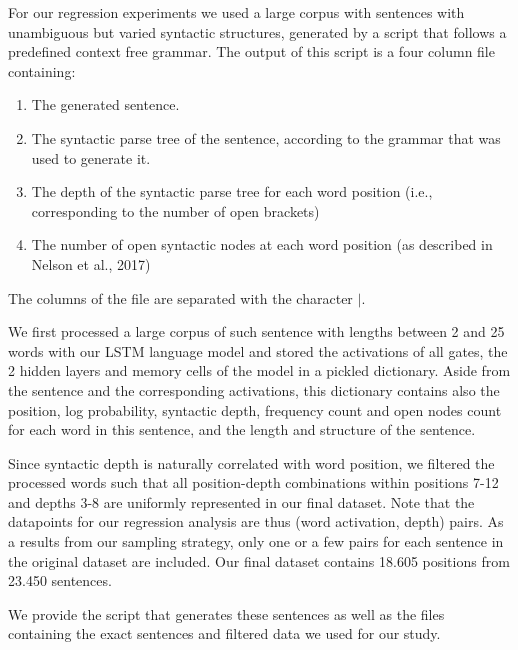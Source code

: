 \documentclass{article}
\begin{document}
For our regression experiments we used a large corpus with sentences with unambiguous but varied syntactic structures, generated by a script that follows a predefined context free grammar.
The output of this script is a four column file containing:\begin{enumerate}
    \item The generated sentence.
    \item The syntactic parse tree of the sentence, according to the grammar that was used to generate it.
    \item The depth of the syntactic parse tree for each word position (i.e., corresponding to the number of open brackets)
    \item The number of open syntactic nodes at each word position (as described in Nelson et al., 2017)
\end{enumerate}

\noindent The columns of the file are separated with the character $|$.

We first processed a large corpus of such sentence with lengths between 2 and 25 words with our LSTM language model and stored the activations of all gates, the 2 hidden layers and memory cells of the model in a pickled dictionary.
Aside from the sentence and the corresponding activations, this dictionary contains also the position, log probability, syntactic depth, frequency count and open nodes count for each word in this sentence, and the length and structure of the sentence.

Since syntactic depth is naturally correlated with word position, we filtered the processed words such that all position-depth combinations within positions 7-12 and depths 3-8 are uniformly represented in our final dataset.
Note that the datapoints for our regression analysis are thus (word activation, depth) pairs. As a results from our sampling strategy, only one or a few pairs for each sentence in the original dataset are included.
Our final dataset contains 18.605 positions from 23.450 sentences.

We provide the script that generates these sentences as well as the files containing the exact sentences and filtered data we used for our study.
\end{document}
